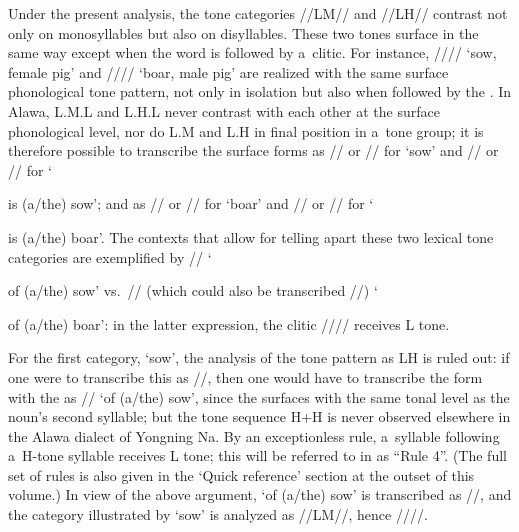 Under the present analysis, the tone categories \mbox{//LM//} and \mbox{//LH//} contrast not only on monosyllables
but also on disyllables. These two tones surface in the same way except when the word is followed by
a~clitic. For instance, //// ‘sow, female pig’ and //// ‘boar, male pig’ are
realized with the same surface phonological tone pattern, not only in isolation but also when
followed by the . In Alawa, L.M.L and L.H.L never contrast with each other at the surface phonological level, nor do L.M and L.H in final position in a~{tone group}; it is therefore possible to transcribe the surface forms as // or // for ‘sow’ and // or // for ‘{is \mbox{(a/the)} sow’; and as // or // for ‘boar’ and // or // for ‘{is \mbox{(a/the)} boar’. The contexts that allow for telling apart these two lexical tone categories are exemplified by // ‘{of \mbox{(a/the)} sow’ vs.\ // (which
could also be transcribed //) ‘{of \mbox{(a/the)} boar’: in the latter expression,
the  clitic //// receives L tone.

For the first category, ‘sow’, the analysis of the tone pattern as LH is ruled out: if one were to
transcribe this as //, then one would have to transcribe the form with the  as
// ‘of \mbox{(a/the)} sow’, since the  surfaces with the same tonal level as the noun's second syllable; but the tone sequence H+H is never observed elsewhere
in the Alawa dialect of Yongning Na. By an exceptionless rule, a~syllable following a~H-tone syllable receives L tone; this will be referred to in  as “Rule 4”. (The full set of rules is also given in the ‘Quick reference’ section at the outset of this volume.) In view of the above argument, ‘of \mbox{(a/the)} sow’ is transcribed as //, and the category illustrated by ‘sow’ is analyzed as \mbox{//LM//}, hence ////.

}}}}
